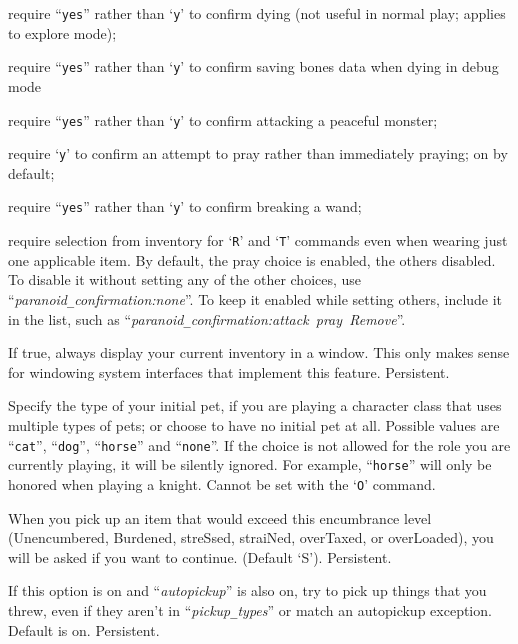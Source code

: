 \item[{\tt die~~~~}]
require ``{\tt yes}'' rather than `{\tt y}' to confirm dying (not
useful in normal play; applies to explore mode);
\item[{\tt bones~~}]
require ``{\tt yes}'' rather than `{\tt y}' to confirm saving
bones data when dying in debug mode
\item[{\tt attack~}]
require ``{\tt yes}'' rather than `{\tt y}' to confirm attacking
a peaceful monster;
\item[{\tt pray~~~}]
require `{\tt y}' to confirm an attempt to pray rather
than immediately praying; on by default;
\item[{\tt wand}]
require ``{\tt yes}'' rather than `{\tt y}' to confirm breaking
a wand;
\item[{\tt Remove~}] require selection from inventory for `{\tt R}' and `{\tt T}'
commands even when wearing just one applicable item.
\elist
By default, the pray choice is enabled, the others disabled.
To disable it without setting
any of the other choices, use ``{\it paranoid\verb+_+confirmation:none}''.  To keep
it enabled while setting others, include it in the list,
such as ``{\it par\-a\-noid\verb+_+con\-fir\-ma\-tion:attack~pray~Remove}''.
\item[\ib{perm\verb+_+invent}]
If true, always display your current inventory in a window.  This only
makes sense for windowing system interfaces that implement this feature.
Persistent.
\item[\ib{pettype}]
Specify the type of your initial pet, if you are playing a character class
that uses multiple types of pets; or choose to have no initial pet at all.
Possible values are ``{\tt cat}'', ``{\tt dog}'', ``{\tt horse}''
and ``{\tt none}''.
If the choice is not allowed for the role you are currently playing,
it will be silently ignored.  For example, ``{\tt horse}'' will only be
honored when playing a knight.
Cannot be set with the `{\tt O}' command.
\item[\ib{pickup\verb+_+burden}]
When you pick up an item that would exceed this encumbrance
level (Unencumbered, Burdened, streSsed, straiNed, overTaxed,
or overLoaded), you will be asked if you want to continue.
(Default `S').  Persistent.
\item[\ib{pickup\verb+_+thrown}]
If this option is on and ``{\it autopickup\/}'' is also on, try to pick up
things that you threw, even if they aren't in ``{\it pickup\verb+_+types\/}'' or
match an autopickup exception.  Default is on.  Persistent.
